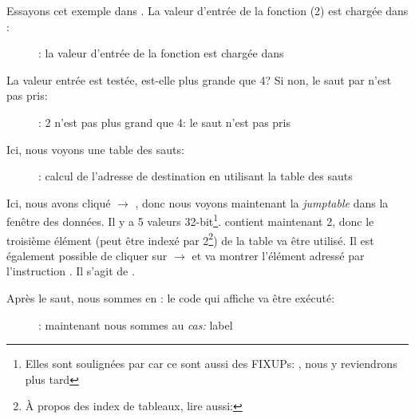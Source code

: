 ﻿\clearpage
\mysubparagraph{\olly}
\myindex{\olly}

Essayons cet exemple dans \olly.
La valeur d'entrée de la fonction (2) est chargée dans \EAX:

\begin{figure}[H]
\centering
{}
\caption{\olly: la valeur d'entrée de la fonction est chargée dans \EAX}
\label{fig:switch_lot_olly1}
\end{figure}

\clearpage
La valeur entrée est testée, est-elle plus grande que 4?
Si non, le saut par  n'est pas pris:
\begin{figure}[H]
\centering
{}
\caption{\olly: 2 n'est pas plus grand que 4: le saut n'est pas pris}
\label{fig:switch_lot_olly2}
\end{figure}

\clearpage
Ici, nous voyons une table des sauts:

\begin{figure}[H]
\centering
{}
\caption{\olly: calcul de l'adresse de destination en utilisant la table des sauts}
\label{fig:switch_lot_olly3}
\end{figure}

Ici, nous avons cliqué  $\rightarrow$ , donc
nous voyons maintenant la \emph{jumptable} dans la fenêtre des données.
Il y a 5 valeurs 32-bit\footnote{Elles sont soulignées par \olly car ce sont aussi
des FIXUPs: , nous y reviendrons plus tard}.
\ECX contient maintenant 2, donc le troisième élément (peut être indexé par 2\footnote{À
propos des index de tableaux, lire aussi: }) de la table va être
utilisé.
Il est également possible de cliquer sur  $\rightarrow$  et \olly va montrer l'élément adressé par l'instruction \JMP.
Il s'agit de .

\clearpage
Après le saut, nous sommes en : le code qui affiche  va être
exécuté:

\begin{figure}[H]
\centering
{}
\caption{\olly: maintenant nous sommes au \emph{cas:} label}
\label{fig:switch_lot_olly4}
\end{figure}
